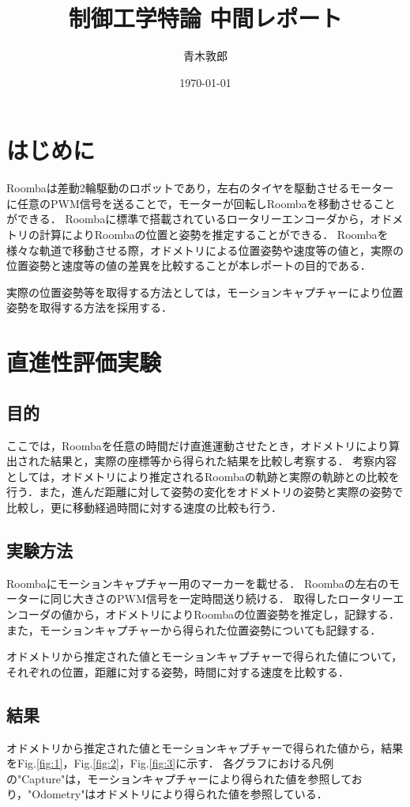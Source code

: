 \documentclass[a4paper,11pt]{jsarticle}
\begin{document}
\title{制御工学特論 中間レポート}
\author{青木敦郎}
\date{\today}
\maketitle

\section{はじめに}
Roombaは差動2輪駆動のロボットであり，左右のタイヤを駆動させるモーターに任意のPWM信号を送ることで，モーターが回転しRoombaを移動させることができる．
Roombaに標準で搭載されているロータリーエンコーダから，オドメトリの計算によりRoombaの位置と姿勢を推定することができる．
Roombaを様々な軌道で移動させる際，オドメトリによる位置姿勢や速度等の値と，実際の位置姿勢と速度等の値の差異を比較することが本レポートの目的である．\par
実際の位置姿勢等を取得する方法としては，モーションキャプチャーにより位置姿勢を取得する方法を採用する．

\section{直進性評価実験}

\subsection{目的}
ここでは，Roombaを任意の時間だけ直進運動させたとき，オドメトリにより算出された結果と，実際の座標等から得られた結果を比較し考察する．
考察内容としては，オドメトリにより推定されるRoombaの軌跡と実際の軌跡との比較を行う．また，進んだ距離に対して姿勢の変化をオドメトリの姿勢と実際の姿勢で比較し，更に移動経過時間に対する速度の比較も行う．

\subsection{実験方法}
Roombaにモーションキャプチャー用のマーカーを載せる．
Roombaの左右のモーターに同じ大きさのPWM信号を一定時間送り続ける．
取得したロータリーエンコーダの値から，オドメトリによりRoombaの位置姿勢を推定し，記録する．
また，モーションキャプチャーから得られた位置姿勢についても記録する．\par
オドメトリから推定された値とモーションキャプチャーで得られた値について，
それぞれの位置，距離に対する姿勢，時間に対する速度を比較する．

\subsection{結果}
オドメトリから推定された値とモーションキャプチャーで得られた値から，結果をFig.{\ref{fig:1}}，Fig.{\ref{fig:2}}，Fig.{\ref{fig:3}}に示す．
各グラフにおける凡例の"Capture"は，モーションキャプチャーにより得られた値を参照しており，"Odometry"はオドメトリにより得られた値を参照している．
\end{document}
